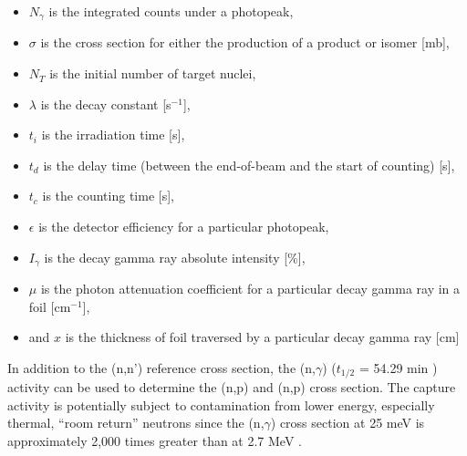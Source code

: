 \documentclass[5p]{elsarticle}
\newcommand{\comment}[1]{\todo[color=blue!20!white,inline]{ASV: #1}}
\begin{document}
\begin{itemize}
  

\item $N_{\gamma}$ is the integrated counts under a photopeak,


\item $\sigma$ is the cross section for either the production of a product or isomer [mb],

\item $N_T$ is the initial number of target nuclei,

\item $\lambda$  is the decay constant [s$^{-1}$],

\item $t_i$ is the irradiation time [s],

\item $t_d$ is the delay time (between the end-of-beam and the start of counting) [s],

\item $t_c$ is the counting time   [s],

\item $\epsilon$ is the  detector efficiency for a particular photopeak,

\item $I_\gamma$ is the decay gamma ray absolute intensity [\%],

\item $\mu$ is the photon attenuation coefficient for a particular decay gamma ray in a foil [cm$^{-1}$],

\item and $x$ is the thickness of foil traversed by a particular decay gamma ray [cm] 
\end{itemize}

In addition to the (n,n') reference cross section, the (n,$\gamma$)  ($t_{1/2}$ = 54.29 min \cite{Blachot2010}) activity can be used to determine the  (n,p) and (n,p) cross section.
 The capture activity is potentially subject to contamination from lower energy, especially thermal, \enquote{room return} neutrons since the (n,$\gamma$) cross section at 25 meV is approximately 2,000 times greater than at 2.7 MeV  \cite{Capote2012,zsolnay2012technical}.
   

\end{document}
